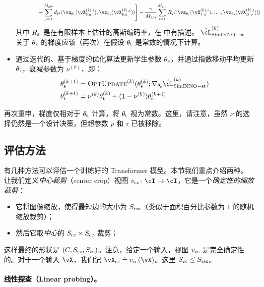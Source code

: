 \documentclass[../../book-main.tex]{subfiles}
\begin{document}
\begin{itemize}
\begin{align}
        &\qquad \qquad + \sum_{j = 1}^{M_{\glo}}d_{\ell^{2}}(\vz_{\theta_{\teacher}}(\vX_{b, g}^{(k), i}), \vz_{\theta_{\student}}(\vX_{b, g}^{(k), j}))\Bigg] - \frac{\gamma}{M_{\glo}}\sum_{i = 1}^{M_{\glo}}R_{\eps}([\vz_{\theta_{\student}}(\vX_{1, g}^{(k), i}), \dots, \vz_{\theta_{\student}}(\vX_{B, g}^{(k), i})])\nonumber
    \end{align}
    其中 \(R_{\varepsilon}\) 是在有限样本上估计的高斯编码率，在  中有描述。 \(\hat{\cL}_{\simdino-\student\teacher}^{(k)}\) 关于 \(\theta_{\mathrm{s}}\) 的梯度应该（再次）在假设 \(\theta_{\mathrm{t}}\) 是常数的情况下计算。
    \item 通过迭代的、基于梯度的优化算法更新学生参数 \(\theta_{\mathrm{s}}\)，并通过指数移动平均更新 \(\theta_{\mathrm{t}}\)，衰减参数为 \(\nu^{(k)}\)，即：
    \begin{align}
        \theta_{\student}^{(k + 1)}
        &= \textsc{OptUpdate}^{(k)}(\theta_{\student}^{(k)}; \nabla_{\theta_{\student}}\hat{\cL}_{\simdino-\student\teacher}^{(k)}) \\
        \theta_{\teacher}^{(k + 1)}
        &= \nu^{(k)}\theta_{\teacher}^{(k)} + (1 - \nu^{(k)})\theta_{\student}^{(k + 1)}.
    \end{align}
\end{itemize}
再次重申，梯度仅相对于 \(\theta_{\mathrm{s}}\) 计算，将 \(\theta_{\mathrm{t}}\) 视为常数。这里，请注意，虽然 \(\nu\) 的选择仍然是一个设计决策，但超参数 \(\rho\) 和 \(\tau\) 已被移除。


\subsection{评估方法}\label{sub:contrastive_learning_evals}
有几种方法可以评估一个训练好的 Transformer 模型。本节我们重点介绍两种。让我们定义\textit{中心裁剪}（center crop）视图 \(v_{\cc} \colon \cI \to \cI\)，它是一个\textit{确定性的缩放裁剪}：
\begin{itemize}
    \item 它将图像缩放，使得最短边的大小为 \(S_{\mathrm{rsz}}\)（类似于面积百分比参数为 \(1\) 的随机缩放裁剪）；
    \item 然后它取\textit{中心}的 \(S_{\mathrm{cc}} \times S_{\mathrm{cc}}\) 裁剪；
\end{itemize}
这样最终的形状是 \((C, S_{\mathrm{cc}}, S_{\mathrm{cc}})\)。注意，给定一个输入，视图 \(v_{\mathrm{cc}}\) 是完全确定性的。对于一个输入 \(\vX\)，我们记 \(\vX_{\cc} \doteq v_{\cc}(\vX)\)。这里 \(S_{\mathrm{cc}} \leq S_{\mathrm{rsz}}\)。


\paragraph{线性探查（Linear probing）。}
\end{document}
